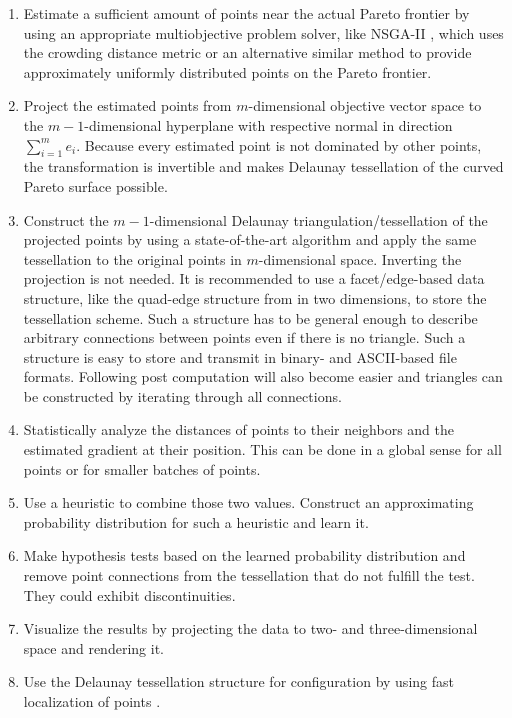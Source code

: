 \documentclass{stdlocal}
\begin{document}
    \begin{enumerate}
      \item Estimate a sufficient amount of points near the actual Pareto frontier by using an appropriate multiobjective problem solver, like NSGA-II \autocite{deb2002}, which uses the crowding distance metric or an alternative similar method to provide approximately uniformly distributed points on the Pareto frontier.

      \item Project the estimated points from $m$-dimensional objective vector space to the $m-1$-dimensional hyperplane with respective normal in direction $\sum_{i=1}^m e_i$.
      Because every estimated point is not dominated by other points, the transformation is invertible and makes Delaunay tessellation of the curved Pareto surface possible.

      \item Construct the $m-1$-dimensional Delaunay triangulation/tessellation of the projected points by using a state-of-the-art algorithm and apply the same tessellation to the original points in $m$-dimensional space.
      Inverting the projection is not needed.
      It is recommended to use a facet/edge-based data structure, like the quad-edge structure from \textcite{guibas1985} in two dimensions, to store the tessellation scheme.
      Such a structure has to be general enough to describe arbitrary connections between points even if there is no triangle.
      Such a structure is easy to store and transmit in binary- and ASCII-based file formats.
      Following post computation will also become easier and triangles can be constructed by iterating through all connections.

      \item Statistically analyze the distances of points to their neighbors and the estimated gradient at their position.
      This can be done in a global sense for all points or for smaller batches of points.

      \item Use a heuristic to combine those two values. Construct an approximating probability distribution for such a heuristic and learn it.

      \item Make hypothesis tests based on the learned probability distribution and remove point connections from the tessellation that do not fulfill the test.
      They could exhibit discontinuities.

      \item Visualize the results by projecting the data to two- and three-dimensional space and rendering it.

      \item Use the Delaunay tessellation structure for configuration by using fast localization of points \autocite{guibas1985}.
    \end{enumerate}
\end{document}
